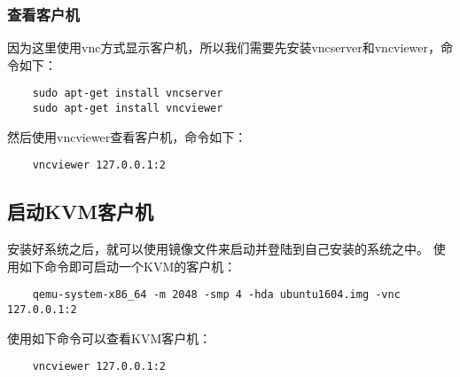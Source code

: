 \documentclass[a4paper,left=2.5cm,right=2.5cm,11pt]{article}
\begin{document}
\subsubsection{查看客户机}
	因为这里使用vnc方式显示客户机，所以我们需要先安装vncserver和vncviewer，命令如下：
	\begin{lstlisting}
	sudo apt-get install vncserver
	sudo apt-get install vncviewer
	\end{lstlisting}

	然后使用vncviewer查看客户机，命令如下：
	\begin{lstlisting}
	vncviewer 127.0.0.1:2
	\end{lstlisting}

\subsection{启动KVM客户机}
	安装好系统之后，就可以使用镜像文件来启动并登陆到自己安装的系统之中。
	使用如下命令即可启动一个KVM的客户机：
	\begin{lstlisting}
	qemu-system-x86_64 -m 2048 -smp 4 -hda ubuntu1604.img -vnc 127.0.0.1:2
	\end{lstlisting}

	使用如下命令可以查看KVM客户机：
	\begin{lstlisting}
	vncviewer 127.0.0.1:2
	\end{lstlisting}
\end{document}
